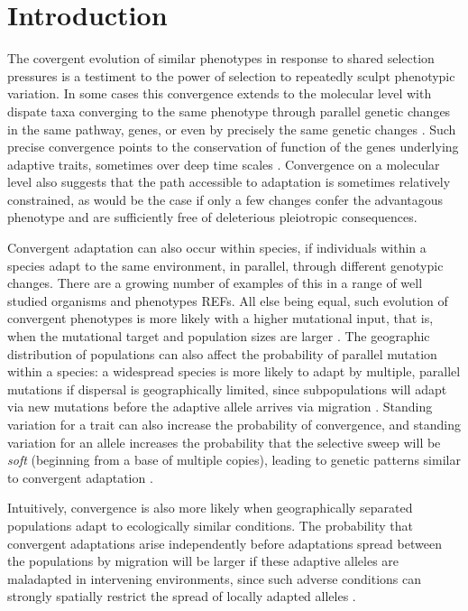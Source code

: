 \documentclass{article}
\begin{document}
\section{Introduction}

The covergent evolution of similar phenotypes in response to shared
selection pressures is a testiment to the power of selection to
repeatedly sculpt phenotypic variation. 
In some cases this convergence extends to the molecular level with
dispate taxa converging to the same phenotype through parallel genetic
changes in the same pathway, genes, 
or even by precisely the same genetic changes \citep{zhen2012parallel}. 
Such precise convergence points to the conservation of function of the genes
underlying adaptive traits, 
sometimes over deep time scales \citep{deephomologypapers}. 
Convergence on a molecular level also suggests that the path 
accessible to adaptation is sometimes relatively constrained, 
as would be the case if only a few changes confer the advantagous phenotype 
and are sufficiently free of deleterious pleiotropic consequences.


Convergent adaptation can also occur within species, if individuals within a species 
adapt to the same environment, in parallel, through different genotypic changes. 
There are a growing number of examples of this in a range of well studied organisms and phenotypes REFs.
All else being equal, such evolution of convergent phenotypes is more likely with a 
higher mutational input, that is, when the mutational target and population sizes are larger \citep{}. 
The geographic distribution of populations can also affect the probability of parallel mutation within a species:
a widespread species is more likely to adapt by multiple, parallel mutations if dispersal is geographically limited, 
since subpopulations will adapt via new mutations before the adaptive allele arrives via migration \citep{ralph2010parallel}. 
Standing variation for a trait can also increase the probability of convergence, 
and standing variation for an allele increases the probability that the selective sweep will be \emph{soft}
(beginning from a base of multiple copies),
leading to genetic patterns similar to convergent adaptation \citep{orr2001sieve,softsweepsI}. 

Intuitively, convergence is also more likely 
when geographically separated populations adapt to ecologically similar conditions. 
The probability that convergent adaptations arise independently
before adaptations spread between the populations by migration
will be larger if these adaptive alleles are maladapted in intervening environments,
since such adverse conditions can strongly spatially restrict the spread of locally adapted alleles \citep{slatkin1973geneflow}.
 
\end{document}
